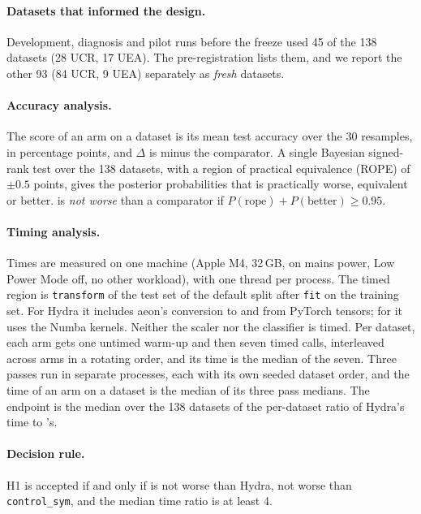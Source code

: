 \paragraph{Datasets that informed the design.} Development, diagnosis and pilot runs before
the freeze used 45 of the 138 datasets (28 UCR, 17 UEA). The pre-registration lists them,
and we report the other 93 (84 UCR, 9 UEA) separately as \emph{fresh} datasets.

\paragraph{Accuracy analysis.} The score of an arm on a dataset is its mean test accuracy
over the 30 resamples, in percentage points, and $\Delta$ is \hh{} minus the comparator. A
single Bayesian signed-rank test \citep{benavoli2017bayesian} over the 138 datasets, with a
region of practical equivalence (ROPE) of $\pm0.5$ points, gives the posterior
probabilities that \hh{} is practically worse, equivalent or better. \hh{} is \emph{not
worse} than a comparator if $P(\text{rope})+P(\text{better})\ge0.95$.

\paragraph{Timing analysis.} Times are measured on one machine (Apple M4, 32\,GB, on mains
power, Low Power Mode off, no other workload), with one thread per process. The timed
region is \texttt{transform} of the test set of the default split after \texttt{fit} on
the training set. For Hydra it includes aeon's conversion to and from PyTorch tensors; for
\hh{} it uses the Numba kernels. Neither the scaler nor the classifier is timed. Per
dataset, each arm gets one untimed warm-up and then seven timed calls, interleaved across
arms in a rotating order, and its time is the median of the seven. Three passes run in
separate processes, each with its own seeded dataset order, and the time of an arm on a
dataset is the median of its three pass medians. The endpoint is the median over the 138
datasets of the per-dataset ratio of Hydra's time to \hh{}'s.

\paragraph{Decision rule.} H1 is accepted if and only if \hh{} is not worse than Hydra, not
worse than \texttt{control\_sym}, and the median time ratio is at least 4.

